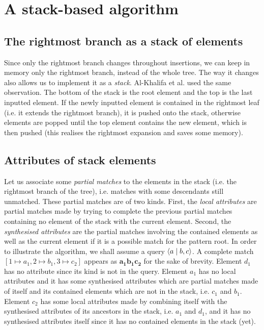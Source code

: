 
\section{A stack-based algorithm}
\label{stack}


\subsection{The rightmost branch as a stack of elements}

Since only the rightmost branch changes throughout insertions, we
can keep in memory only the rightmost branch, instead of the whole
\XML tree. The way it changes also allows us to implement it as a
\emph{stack}. Al-Khalifa et al. \cite{AlKhalifa:2002} used the same
observation. The bottom of the stack is the root element and the top
is the last inputted element. If the newly inputted element is
contained in the rightmost leaf (i.e. it extends the rightmost
branch), it is pushed onto the stack, otherwise elements are popped
until the top element contains the new element, which is then pushed
(this realises the rightmost expansion and saves some memory).


\subsection{Attributes of stack elements}

Let us associate some \emph{partial matches} to the elements in the
stack (i.e. the rightmost branch of the \XML tree), i.e. matches with
some descendants still unmatched. These partial matches are of two
kinds. First, the \emph{local attributes} are partial matches made by
trying to complete the previous partial matches containing no element
of the stack with the current element. Second, the \emph{synthesised
  attributes} are the partial matches involving the contained elements
as well as the current element if it is a possible match for the
pattern root. In order to illustrate the algorithm, we shall assume a
query \(\langle a \mid b,c\rangle\). A complete match \([1 \mapsto a_1, 2 \mapsto
  b_1, 3 \mapsto c_2]\) appears as \(\mathbf{a_1b_1c_2}\) for the sake
of brevity. Element \(d_1\) has no attribute since its kind is not in
the query. Element \(a_1\) has no local attributes and it has some
synthesised attributes which are partial matches made of itself and
its contained elements which are not in the stack, i.e. \(c_1\) and
\(b_1\). Element \(c_2\) has some local attributes made by combining
itself with the synthesised attributes of its ancestors in the stack,
i.e. \(a_1\) and \(d_1\), and it has no synthesised attributes itself
since it has no contained elements in the stack (yet).


